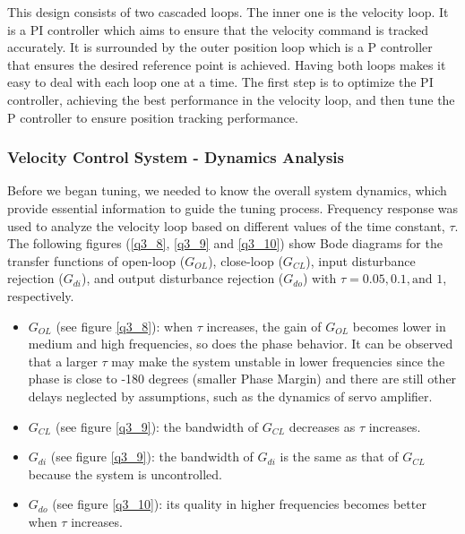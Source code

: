 \documentclass{article}
\theoremstyle{plain}
\theoremstyle{definition}
\theoremstyle{remark}
\begin{document}
This design consists of two cascaded loops. The inner one is the velocity loop. It is a PI controller which aims to ensure that the velocity command is tracked accurately. It is surrounded by the outer position loop which is a P controller that ensures the desired reference point is achieved. Having both loops makes it easy to deal with each loop one at a time. The first step is to optimize the PI controller, achieving the best performance in the velocity loop, and then tune the P controller to ensure position tracking performance.\\

\subsubsection*{Velocity Control System - Dynamics Analysis}
Before we began tuning, we needed to know the overall system dynamics, which provide essential information to guide the tuning process. Frequency response was used to analyze the velocity loop based on different values of the time constant, $\tau$. The following figures (\ref{q3_8}, \ref{q3_9} and \ref{q3_10}) show Bode diagrams for the transfer functions of open-loop ($G_{OL}$), close-loop ($G_{CL}$), input disturbance rejection ($G_{di}$), and output disturbance rejection ($G_{do}$) with $\tau = 0.05, 0.1, \text{and } 1$, respectively.

\begin{itemize}
\item $G_{OL}$ (see figure \ref{q3_8}): when $\tau$ increases, the gain of $G_{OL}$ becomes lower in medium and high frequencies, so does the phase behavior. It can be observed that a larger $\tau$ may make the system unstable in lower frequencies since the phase is close to -180 degrees (smaller Phase Margin) and there are still other delays neglected by assumptions, such as the dynamics of servo amplifier.   

\item $G_{CL}$ (see figure \ref{q3_9}): the bandwidth of $G_{CL}$ decreases as $\tau$ increases. 

\item $G_{di}$ (see figure \ref{q3_9}): the bandwidth of $G_{di}$ is the same as that of $G_{CL}$ because the system is uncontrolled.

\item $G_{do}$ (see figure \ref{q3_10}): its quality in higher frequencies becomes better when $\tau$ increases.

\end{itemize}
\end{document}
